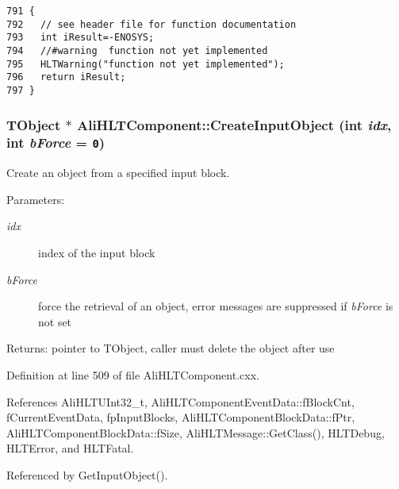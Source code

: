 \footnotesize\begin{verbatim}791 {
792   // see header file for function documentation
793   int iResult=-ENOSYS;
794   //#warning  function not yet implemented
795   HLTWarning("function not yet implemented");
796   return iResult;
797 }
\end{verbatim}\normalsize 


\subsubsection{\setlength{\rightskip}{0pt plus 5cm}TObject $\ast$ Ali\-HLTComponent::Create\-Input\-Object (int {\em idx}, int {\em b\-Force} = {\tt 0})\hspace{0.3cm}{\tt  [private]}}\label{classAliHLTComponent_d3}


Create an object from a specified input block. \begin{Desc}
\item[Parameters:]
\begin{description}
\item[{\em idx}]index of the input block \item[{\em b\-Force}]force the retrieval of an object, error messages are suppressed if {\em b\-Force\/} is not set \end{description}
\end{Desc}
\begin{Desc}
\item[Returns:]pointer to TObject, caller must delete the object after use \end{Desc}


Definition at line 509 of file Ali\-HLTComponent.cxx.

References Ali\-HLTUInt32\_\-t, Ali\-HLTComponent\-Event\-Data::f\-Block\-Cnt, f\-Current\-Event\-Data, fp\-Input\-Blocks, Ali\-HLTComponent\-Block\-Data::f\-Ptr, Ali\-HLTComponent\-Block\-Data::f\-Size, Ali\-HLTMessage::Get\-Class(), HLTDebug, HLTError, and HLTFatal.

Referenced by Get\-Input\-Object().

